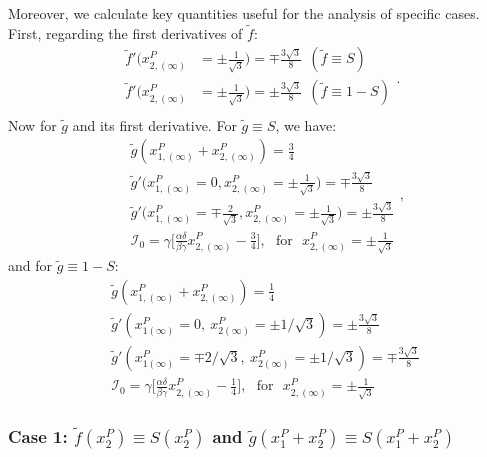 Moreover, we calculate key quantities useful for the analysis of specific cases. First, regarding the first 
derivatives of $\tilde{f}$:
\begin{equation}
    \begin{aligned}
        \tilde{f}'\Big(x_{2,(\infty)}^P &= \pm \frac{1}{\sqrt{3}}\Big) = \mp \frac{3\sqrt{3}}{8} \ \ (\tilde{f} \equiv S)\\
        \tilde{f}'\Big(x_{2,(\infty)}^P &= \pm \frac{1}{\sqrt{3}}\Big) = \pm \frac{3\sqrt{3}}{8} \ \ (\tilde{f} \equiv 1 - S)\\
    \end{aligned}.
\end{equation}
Now for $\tilde{g}$ and its first derivative. For $\tilde{g} \equiv S$, we have:
\begin{equation}
    \begin{aligned}
        &\tilde{g}(x_{1,(\infty)}^P + x_{2,(\infty)}^P) = \frac{3}{4}\\
        &\tilde{g}'\Big(x_{1,(\infty)}^P = 0, x_{2,(\infty)}^P = \pm \frac{1}{\sqrt{3}}\Big) = \mp \frac{3\sqrt{3}}{8} \\
        &\tilde{g}'\Big(x_{1,(\infty)}^P = \mp\frac{2}{\sqrt{3}}, x_{2,(\infty)}^P = \pm \frac{1}{\sqrt{3}}\Big) = \pm \frac{3\sqrt{3}}{8}\\
        &\mathcal{I}_0 = \gamma\bigg[ \frac{\alpha\delta}{\beta\gamma}x_{2,(\infty)}^P - \frac{3}{4} \bigg], \ \ \ \text{for} \ \ \ x_{2,(\infty)}^P = \pm\frac{1}{\sqrt{3}}
    \end{aligned},
\end{equation}
and for $\tilde{g} \equiv 1 - S$:
\begin{equation}
    \begin{aligned}
        &\tilde{g}(x_{1,(\infty)}^P + x_{2,(\infty)}^P) = \frac{1}{4}\\
        &\tilde{g}'(x_{1(\infty)}^P = 0, \ x_{2(\infty)}^P = \pm 1/\sqrt{3}) = \pm \frac{3\sqrt{3}}{8} \\
        &\tilde{g}'(x_{1(\infty)}^P = \mp 2/\sqrt{3}, \ x_{2(\infty)}^P = \pm 1/\sqrt{3}) = \mp \frac{3\sqrt{3}}{8} \\
        &\mathcal{I}_0 = \gamma\bigg[ \frac{\alpha\delta}{\beta\gamma}x_{2,(\infty)}^P - \frac{1}{4} \bigg], \ \ \ \text{for} \ \ \ x_{2,(\infty)}^P = \pm\frac{1}{\sqrt{3}}
    \end{aligned}
\end{equation}


\subsubsection{Case 1: $\tilde{f}(x_2^P) \equiv S(x_2^P)$ and $\tilde{g}(x_1^P + x_2^P) \equiv S(x_1^P + x_2^P)$}

